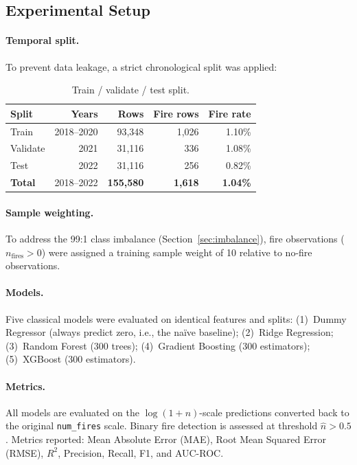 \documentclass[11pt,a4paper]{article}
\begin{document}
\subsection{Experimental Setup}

\paragraph{Temporal split.}
To prevent data leakage, a strict chronological split was applied:

\begin{table}[H]
\centering
\caption{Train / validate / test split.}
\begin{tabular}{lrrrr}
\toprule
\textbf{Split} & \textbf{Years} & \textbf{Rows} & \textbf{Fire rows} & \textbf{Fire rate} \\
\midrule
Train      & 2018--2020 & 93,348 & 1,026 & 1.10\% \\
Validate   & 2021       & 31,116 & 336   & 1.08\% \\
Test       & 2022       & 31,116 & 256   & 0.82\% \\
\midrule
\textbf{Total} & 2018--2022 & \textbf{155,580} & \textbf{1,618} & \textbf{1.04\%} \\
\bottomrule
\end{tabular}
\label{tab:split}
\end{table}

\paragraph{Sample weighting.}
To address the 99:1 class imbalance (Section~\ref{sec:imbalance}),
fire observations ($n_{\text{fires}} > 0$) were assigned a training sample
weight of 10 relative to no-fire observations.

\paragraph{Models.}
Five classical models were evaluated on identical features and splits:
(1)~Dummy Regressor (always predict zero, i.e., the na\"{i}ve baseline);
(2)~Ridge Regression; (3)~Random Forest (300 trees);
(4)~Gradient Boosting (300 estimators); (5)~XGBoost (300 estimators).

\paragraph{Metrics.}
All models are evaluated on the $\log(1 + n)$-scale predictions converted
back to the original \texttt{num\_fires} scale. Binary fire detection is
assessed at threshold $\hat{n} > 0.5$. Metrics reported:
Mean Absolute Error (MAE), Root Mean Squared Error (RMSE),
$R^2$, Precision, Recall, F1, and AUC-ROC.
\end{document}
